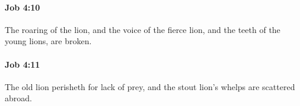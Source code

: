 		\paragraph{Job 4:10} %
			\label{JOB-4-10}

			The roaring of the lion, and the voice of the fierce lion, and the teeth of the young lions, are broken.


		\paragraph{Job 4:11} %
			\label{JOB-4-11}

			The old lion perisheth for lack of prey, and the stout lion’s whelps are scattered abroad.


